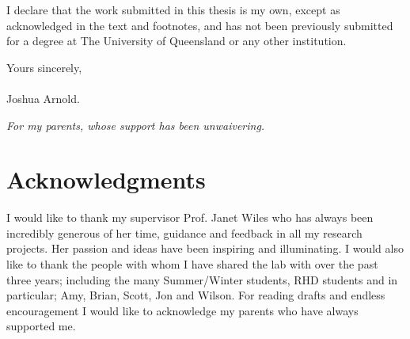\documentclass[12pt,openany,a4paper]{book}
\renewcommand{\baselinestretch}{1.2}	%
\begin{document}
I declare that the work submitted in this thesis is my own, except as
acknowledged in the text and footnotes, and has not been previously
submitted for a degree at The University of Queensland or any other
institution.

\begin{flushright}
	Yours sincerely,\\
	\medskip
	\emph{}\\
	\medskip
	Joshua Arnold.
\end{flushright}

\cleardoublepage

\vspace*{70mm}
\begin{center}
\renewcommand{\baselinestretch}{1.0}
\sl
	For my parents, whose support has been unwaivering.
\end{center}

\chapter{Acknowledgments}

I would like to thank my supervisor Prof. Janet Wiles who has always been incredibly generous of her time, guidance and feedback in all my research projects.
Her passion and ideas have been inspiring and illuminating. 
I would also like to thank the people with whom I have shared the lab with over the past three years; including the many Summer/Winter students, RHD students and in particular; Amy, Brian, Scott, Jon and Wilson.
For reading drafts and endless encouragement I would like to acknowledge my parents who have always supported me. 




\end{document}
